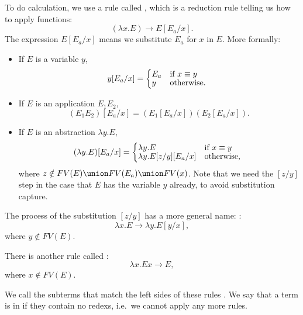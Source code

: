 \documentclass[class=scrartcl]{standalone}
\begin{document}
To do calculation, we use a rule called ,
which is a reduction rule telling us how to apply functions:
\[
  (\lambda x. E) \to E[E_a / x].
\]
The expression \(E[E_a / x]\) means
we substitute \(E_a\) for \(x\) in \(E\).
More formally:
\begin{itemize}
  \item If \(E\) is a variable \(y\),
        \[
          y[E_a / x] = \begin{cases*}
              E_a & if \(x \equiv y\) \\[-1ex]
            y & otherwise.
          \end{cases*}
        \]
  \item If \(E\) is an application \(E_1 E_2\),
        \[
          (E_1 E_2)[E_a / x] = (E_1[E_a / x]) (E_2[E_a / x]).
        \]
  \item If \(E\) is an abstraction \(\lambda y. E\),
        \[
          (\lambda y. E)[E_a / x] =
          \begin{cases*}
            \lambda y. E & if \(x \equiv y\) \\[-1ex]
            \lambda y. E[z / y][E_a / x] & otherwise, %
          \end{cases*}
        \]
        where \(z \notin FV(E) \union FV(E_a) \union FV(x)\).
        Note that we need the \([z / y]\) step in the case
        that \(E\) has the variable \(y\) already,
        to avoid substitution capture.
\end{itemize}

The process of the substitution \([z / y]\) has a more general name:
:
\[
  \lambda x. E \to \lambda y.E[y / x],
\]
where \(y \notin FV(E)\).

There is another rule called :
\[
  \lambda x. E x \to E,
\]
where \(x \notin FV(E)\).

We call the subterms that match the left sides of these rules .
We say that a term is in  if they contain no redexs,
i.e.\ we cannot apply any more rules.
\end{document}
